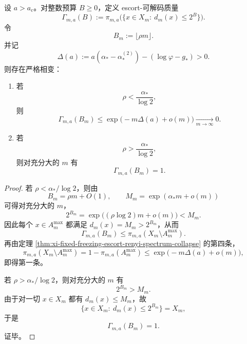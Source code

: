 \begin{theorem}[冻结相中的辨路径位率相变]\label{thm:xi-fixed-freezing-path-budget-phase-transition}
设 \(a>a_{\mathrm c}\)。对整数预算 \(B\ge 0\)，定义 escort-可解码质量
\[
\Gamma_{m,a}(B):=
\pi_{m,a}\bigl(\{x\in X_m:\ d_m(x)\le 2^B\}\bigr).
\]
令
\[
B_m:=\lfloor \rho m\rfloor.
\]
并记
\[
\Delta(a):=a(\alpha_*-\alpha_*^{(2)})-(\log\varphi-g_*)>0.
\]
则存在严格相变：
\begin{enumerate}
  \item 若
  \[
  \rho<\frac{\alpha_*}{\log 2},
  \]
  则
  \[
  \Gamma_{m,a}(B_m)\le \exp\!\bigl(-m\Delta(a)+o(m)\bigr)\xrightarrow[m\to\infty]{}0.
  \]
  \item 若
  \[
  \rho>\frac{\alpha_*}{\log 2},
  \]
  则对充分大的 \(m\) 有
  \[
  \Gamma_{m,a}(B_m)=1.
  \]
\end{enumerate}
\end{theorem}
\begin{proof}
若 \(\rho<\alpha_*/\log 2\)，则由
\[
B_m=\rho m+O(1),
\qquad
M_m=\exp(\alpha_*m+o(m))
\]
可得对充分大的 \(m\)，
\[
2^{B_m}=\exp\!\bigl((\rho\log 2)m+o(m)\bigr)<M_m.
\]
因此每个 \(x\in A_m^{\max}\) 都满足 \(d_m(x)=M_m>2^{B_m}\)，从而
\[
\Gamma_{m,a}(B_m)\le \pi_{m,a}(X_m\setminus A_m^{\max}).
\]
再由定理 \ref{thm:xi-fixed-freezing-escort-renyi-spectrum-collapse} 的第四条，
\[
\pi_{m,a}(X_m\setminus A_m^{\max})
=
1-\pi_{m,a}(A_m^{\max})
\le
\exp\!\bigl(-m\Delta(a)+o(m)\bigr),
\]
即得第一条。

若 \(\rho>\alpha_*/\log 2\)，则对充分大的 \(m\) 有
\[
2^{B_m}>M_m.
\]
由于对一切 \(x\in X_m\) 都有 \(d_m(x)\le M_m\)，故
\[
\{x\in X_m:\ d_m(x)\le 2^{B_m}\}=X_m,
\]
于是
\[
\Gamma_{m,a}(B_m)=1.
\]
证毕。
\end{proof}

